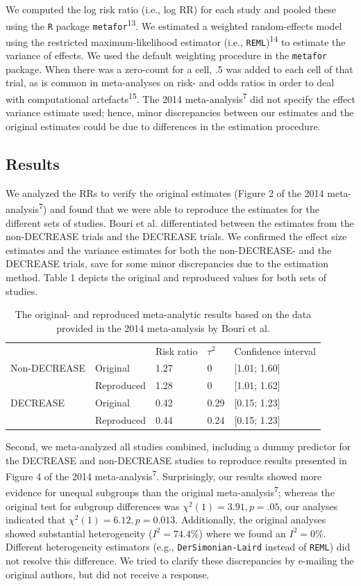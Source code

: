 \documentclass[]{article}
\begin{document}
We computed the log risk ratio (i.e., log RR) for each study and pooled
these using the \texttt{R} package \texttt{metafor}\textsuperscript{13}.
We estimated a weighted random-effects model using the restricted
maximum-likelihood estimator (i.e., \texttt{REML})\textsuperscript{14}
to estimate the variance of effects. We used the default weighting
procedure in the \texttt{metafor} package. When there was a zero-count
for a cell, .5 was added to each cell of that trial, as is common in
meta-analyses on risk- and odds ratios in order to deal with
computational artefacts\textsuperscript{15}. The 2014
meta-analysis\textsuperscript{7} did not specify the effect variance
estimate used; hence, minor discrepancies between our estimates and the
original estimates could be due to differences in the estimation
procedure.

\subsection{Results}\label{results}

We analyzed the RRs to verify the original estimates (Figure 2 of the
2014 meta-analysis\textsuperscript{7}) and found that we were able to
reproduce the estimates for the different sets of studies. Bouri et al.
differentiated between the estimates from the non-DECREASE trials and
the DECREASE trials. We confirmed the effect size estimates and the
variance estimates for both the non-DECREASE- and the DECREASE trials,
save for some minor discrepancies due to the estimation method. Table 1
depicts the original and reproduced values for both sets of studies.

\begin{longtable}[]{@{}lllll@{}}
\caption{The original- and reproduced meta-analytic results based on the
data provided in the 2014 meta-analysis by Bouri et al.}\tabularnewline
\toprule
& & Risk ratio & \(\tau^2\) & Confidence interval\tabularnewline
Non-DECREASE & Original & 1.27 & 0 & {[}1.01; 1.60{]}\tabularnewline
& Reproduced & 1.28 & 0 & {[}1.01; 1.62{]}\tabularnewline
DECREASE & Original & 0.42 & 0.29 & {[}0.15; 1.23{]}\tabularnewline
& Reproduced & 0.44 & 0.24 & {[}0.15; 1.23{]}\tabularnewline
\bottomrule
\end{longtable}

Second, we meta-analyzed all studies combined, including a dummy
predictor for the DECREASE and non-DECREASE studies to reproduce results
presented in Figure 4 of the 2014 meta-analysis\textsuperscript{7}.
Surprisingly, our results showed more evidence for unequal subgroups
than the original meta-analysis\textsuperscript{7}; whereas the original
test for subgroup differences was \(\chi^2(1)=3.91,p=.05\), our analyses
indicated that \(\chi^2(1)=6.12,p=0.013\). Additionally, the original
analyses showed substantial heterogeneity (\(I^2=74.4\)\%) where we
found an \(I^2=0\)\%. Different heterogeneity estimators (e.g.,
\texttt{DerSimonian-Laird} instead of \texttt{REML}) did not resolve
this difference. We tried to clarify these discrepancies by e-mailing
the original authors, but did not receive a response.
\end{document}
